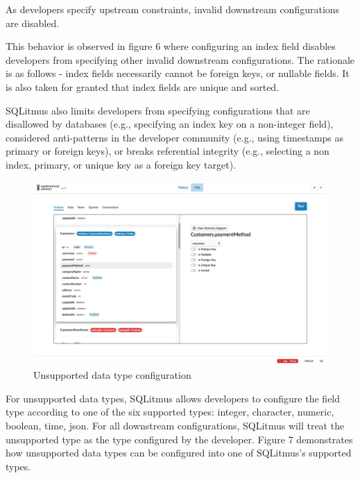 \documentclass[12pt]{report}
\begin{document}
\begin{spacing}{1.9}
		As developers specify upstream constraints, invalid downstream configurations are disabled.
		
		This behavior is observed in figure 6 where configuring an index field disables developers from specifying other invalid downstream configurations. The rationale is as follows - index fields necessarily cannot be foreign keys, or nullable fields. It is also taken for granted that index fields are unique and sorted.
		
		SQLitmus also limits developers from specifying configurations that are disallowed by databases (e.g., specifying an index key on a non-integer field), considered anti-patterns in the developer community (e.g., using timestamps as primary or foreign keys), or breaks referential integrity (e.g., selecting a non index, primary, or unique key as a foreign key target). 
		
		
		\begin{figure}[H]
			\centering
			\includegraphics[width=\textwidth]{3-2-1c.png}
			\caption{Unsupported data type configuration}
			
		\end{figure}
		
		For unsupported data types, SQLitmus allows developers to configure the field type according to one of the six supported types: integer, character, numeric, boolean, time, json. For all downstream configurations, SQLitmus will treat the unsupported type as the type configured by the developer. Figure 7 demonstrates how unsupported data types can be configured into one of SQLitmus's supported types.
		
		
		

\end{spacing}
\end{document}
